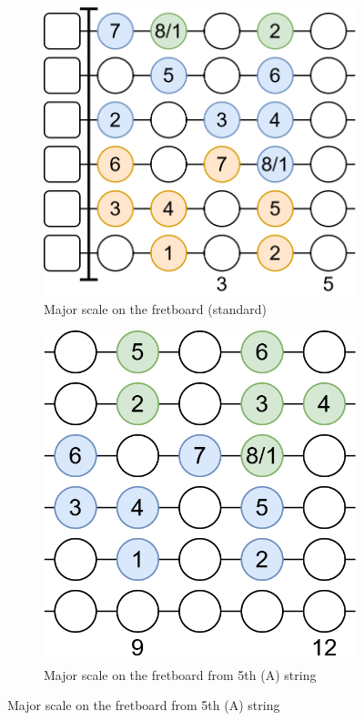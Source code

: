 \begin{figure}[h]
	\begin{subfigure}[b]{0.45\textwidth}
		\centering
		\includegraphics[height=0.18\textheight]{../../Images/guitar_major_scale_standard.png}
		\caption{Major scale on the fretboard (standard)}
		\label{fig:guitar_major_scale_fretboard_standard}
	\end{subfigure}
	\hfill
	\begin{subfigure}[b]{0.45\textwidth}
		\centering
		\includegraphics[height=0.18\textheight]{../../Images/guitar_major_scale_standard_start_5th_string.png}
		\caption{Major scale on the fretboard from 5th (A) string}
		\label{fig:guitar_major_scale_fretboard_standard_start_5th_string}
	\end{subfigure}
	

\end{figure}
